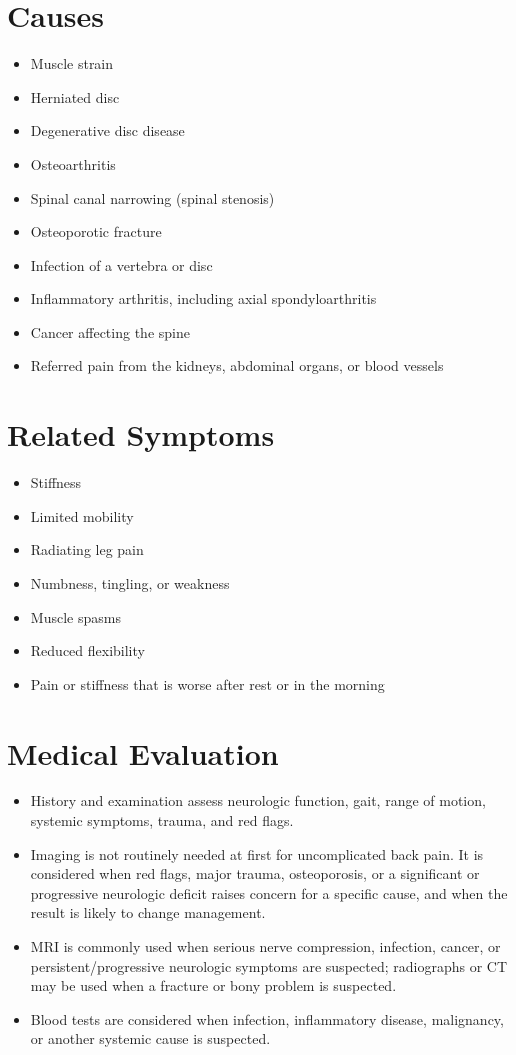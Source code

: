 \section*{Causes}
\begin{itemize}
 \item Muscle strain
 \item Herniated disc
 \item Degenerative disc disease
 \item Osteoarthritis
 \item Spinal canal narrowing (spinal stenosis)
 \item Osteoporotic fracture
 \item Infection of a vertebra or disc
 \item Inflammatory arthritis, including axial spondyloarthritis
 \item Cancer affecting the spine
 \item Referred pain from the kidneys, abdominal organs, or blood vessels
\end{itemize}

\section*{Related Symptoms}
\begin{itemize}
 \item Stiffness
 \item Limited mobility
 \item Radiating leg pain
 \item Numbness, tingling, or weakness
 \item Muscle spasms
 \item Reduced flexibility
 \item Pain or stiffness that is worse after rest or in the morning
\end{itemize}

\section*{Medical Evaluation}
\begin{itemize}
 \item History and examination assess neurologic function, gait, range of motion, systemic symptoms, trauma, and red flags.
 \item Imaging is not routinely needed at first for uncomplicated back pain. It is considered when red flags, major trauma, osteoporosis, or a significant or progressive neurologic deficit raises concern for a specific cause, and when the result is likely to change management.
 \item MRI is commonly used when serious nerve compression, infection, cancer, or persistent/progressive neurologic symptoms are suspected; radiographs or CT may be used when a fracture or bony problem is suspected.
 \item Blood tests are considered when infection, inflammatory disease, malignancy, or another systemic cause is suspected.
\end{itemize}

